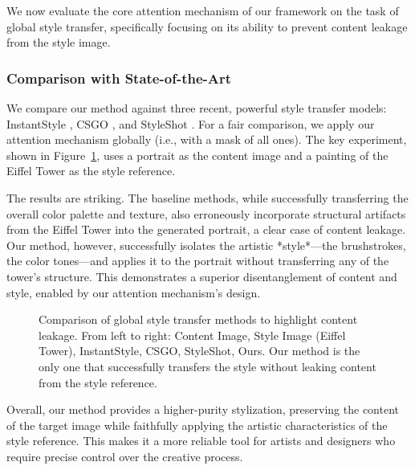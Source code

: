 We now evaluate the core attention mechanism of our framework on the task of global style transfer, specifically focusing on its ability to prevent content leakage from the style image.

\subsubsection{Comparison with State-of-the-Art}
We compare our method against three recent, powerful style transfer models: InstantStyle \cite{wang2024instantstyle}, CSGO \cite{xing2024csgo}, and StyleShot \cite{gao2024styleshot}. For a fair comparison, we apply our attention mechanism globally (i.e., with a mask of all ones). The key experiment, shown in Figure~\ref{fig:global_comparison}, uses a portrait as the content image and a painting of the Eiffel Tower as the style reference.

The results are striking. The baseline methods, while successfully transferring the overall color palette and texture, also erroneously incorporate structural artifacts from the Eiffel Tower into the generated portrait, a clear case of content leakage. Our method, however, successfully isolates the artistic *style*—the brushstrokes, the color tones—and applies it to the portrait without transferring any of the tower's structure. This demonstrates a superior disentanglement of content and style, enabled by our attention mechanism's design.

\begin{figure}[h]
  \centering
  \caption{Comparison of global style transfer methods to highlight content leakage. From left to right: Content Image, Style Image (Eiffel Tower), InstantStyle, CSGO, StyleShot, Ours. Our method is the only one that successfully transfers the style without leaking content from the style reference.}
  \label{fig:global_comparison}
\end{figure}

Overall, our method provides a higher-purity stylization, preserving the content of the target image while faithfully applying the artistic characteristics of the style reference.
This makes it a more reliable tool for artists and designers who require precise control over the creative process.